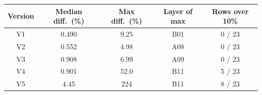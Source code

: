 \begin{tabular}{ccccc}
\hline
\rowcolor{headgrey}
\textbf{Version} & \textbf{Median diff.\ (\%)} & \textbf{Max diff.\ (\%)} & \textbf{Layer of max} & \textbf{Rows over 10\%} \\ \hline
V1 & 0.490 & 9.25 & B01 & 0 / 23 \\
V2 & 0.552 & 4.98 & A08 & 0 / 23 \\
V3 & 0.908 & 6.99 & A09 & 0 / 23 \\
V4 & 0.901 & 52.0 & B11 & 5 / 23 \\
V5 & 4.45 & 224 & B11 & 8 / 23 \\
\hline
\end{tabular}
